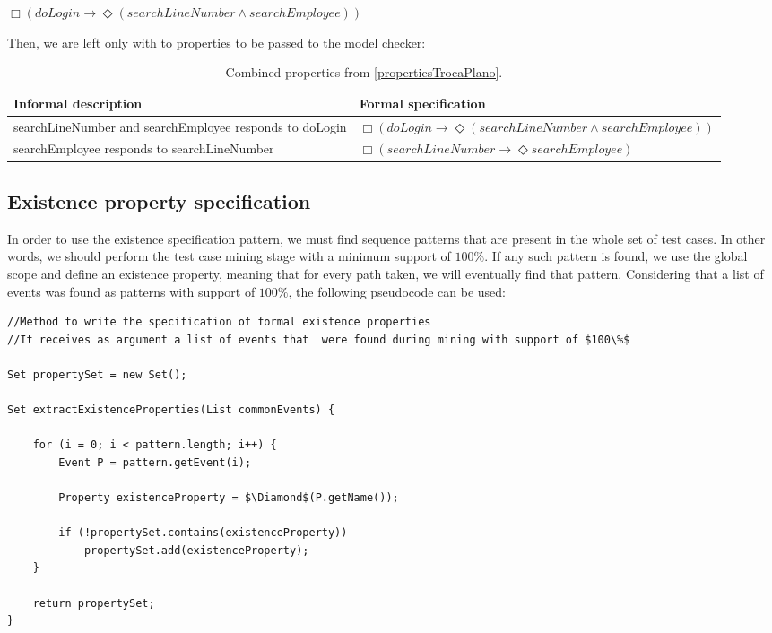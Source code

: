 \begin{center}
$\Box (doLogin \rightarrow \Diamond (searchLineNumber \wedge searchEmployee))$
\end{center}

Then, we are left only with to properties to be passed to the model checker:

\begin{table}[h]
\begin{center}
\begin{tabular}{|p{5cm}| l|}

\hline

Informal description & Formal specification \\ \hline

searchLineNumber and searchEmployee responds to doLogin & $\Box (doLogin \rightarrow \Diamond (searchLineNumber \wedge searchEmployee))$\\ \hline

searchEmployee responds to searchLineNumber & $\Box (searchLineNumber \rightarrow \Diamond searchEmployee)$ \\

\hline
\end{tabular}
\end{center}
\caption{Combined properties from \ref{propertiesTrocaPlano}.}
\label{propertiesTrocaPlanoConcise}
\end{table}

\subsection{Existence property specification}

In order to use the existence specification pattern, we must find sequence patterns that are present in the whole set of test cases. In other words, we should perform the test case mining stage with a minimum support of $100\%$. If any such pattern is found, we use the global scope and define an existence property, meaning that for every path taken, we will eventually find that pattern. Considering that a list of events was found as patterns with support of $100\%$, the following pseudocode can be used:

\begin{lstlisting}[mathescape]
//Method to write the specification of formal existence properties
//It receives as argument a list of events that  were found during mining with support of $100\%$

Set propertySet = new Set();

Set extractExistenceProperties(List commonEvents) {

	for (i = 0; i < pattern.length; i++) {
		Event P = pattern.getEvent(i);

		Property existenceProperty = $\Diamond$(P.getName());

		if (!propertySet.contains(existenceProperty))
			propertySet.add(existenceProperty);
	}

	return propertySet;
}
\end{lstlisting}

